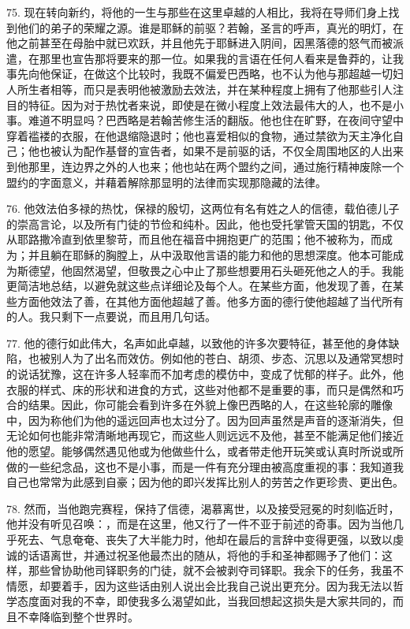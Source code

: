 75. 现在转向新约，将他的一生与那些在这里卓越的人相比，我将在导师们身上找到他们的弟子的荣耀之源。谁是耶稣的前驱？若翰，圣言的呼声，真光的明灯，在他之前甚至在母胎中就已欢跃，并且他先于耶稣进入阴间，因黑落德的怒气而被派遣，在那里也宣告那将要来的那一位。如果我的言语在任何人看来是鲁莽的，让我事先向他保证，在做这个比较时，我既不偏爱巴西略，也不认为他与那超越一切妇人所生者相等，而只是表明他被激励去效法，并在某种程度上拥有了他那些引人注目的特征。因为对于热忱者来说，即使是在微小程度上效法最伟大的人，也不是小事。难道不明显吗？巴西略是若翰苦修生活的翻版。他也住在旷野，在夜间守望中穿着褴褛的衣服，在他退缩隐退时；他也喜爱相似的食物，通过禁欲为天主净化自己；他也被认为配作基督的宣告者，如果不是前驱的话，不仅全周围地区的人出来到他那里，连边界之外的人也来；他也站在两个盟约之间，通过施行精神废除一个盟约的字面意义，并藉着解除那显明的法律而实现那隐藏的法律。\par

76. 他效法伯多禄的热忱，保禄的殷切，这两位有名有姓之人的信德，载伯德儿子的崇高言论，以及所有门徒的节俭和纯朴。因此，他也受托掌管天国的钥匙，不仅从耶路撒冷直到依里黎苛，而且他在福音中拥抱更广的范围；他不被称为，而成为；并且躺在耶稣的胸膛上，从中汲取他言语的能力和他的思想深度。他本可能成为斯德望，他固然渴望，但敬畏之心中止了那些想要用石头砸死他之人的手。我能更简洁地总结，以避免就这些点详细论及每个人。在某些方面，他发现了善，在某些方面他效法了善，在其他方面他超越了善。他多方面的德行使他超越了当代所有的人。我只剩下一点要说，而且用几句话。\par

77. 他的德行如此伟大，名声如此卓越，以致他的许多次要特征，甚至他的身体缺陷，也被别人为了出名而效仿。例如他的苍白、胡须、步态、沉思以及通常冥想时的说话犹豫，这在许多人轻率而不加考虑的模仿中，变成了忧郁的样子。此外，他衣服的样式、床的形状和进食的方式，这些对他都不是重要的事，而只是偶然和巧合的结果。因此，你可能会看到许多在外貌上像巴西略的人，在这些轮廓的雕像中，因为称他们为他的遥远回声也太过分了。因为回声虽然是声音的逐渐消失，但无论如何也能非常清晰地再现它，而这些人则远远不及他，甚至不能满足他们接近他的愿望。能够偶然遇见他或为他做些什么，或者带走他开玩笑或认真时所说或所做的一些纪念品，这也不是小事，而是一件有充分理由被高度重视的事：我知道我自己也常常为此感到自豪；因为他的即兴发挥比别人的劳苦之作更珍贵、更出色。\par

78. 然而，当他跑完赛程，保持了信德，渴慕离世，以及接受冠冕的时刻临近时，他并没有听见召唤：，而是在这里，他又行了一件不亚于前述的奇事。因为当他几乎死去、气息奄奄、丧失了大半能力时，他却在最后的言辞中变得更强，以致以虔诚的话语离世，并通过祝圣他最杰出的随从，将他的手和圣神都赐予了他们：这样，那些曾协助他司铎职务的门徒，就不会被剥夺司铎职。我余下的任务，我虽不情愿，却要着手，因为这些话由别人说出会比我自己说出更充分。因为我无法以哲学态度面对我的不幸，即使我多么渴望如此，当我回想起这损失是大家共同的，而且不幸降临到整个世界时。\par

